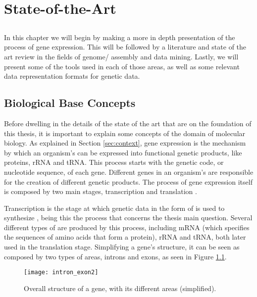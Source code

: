 \chapter{State-of-the-Art} \label{chap:sota}

\section*{}

In this chapter we will begin by making a more in depth presentation of the
process of gene expression. This will be followed by a literature and state of
the art review in the fields of genome/\trans{} assembly and data mining.
Lastly, we will present some of the tools used in each of those areas, as well
as some relevant data representation formats for genetic data.

\section{Biological Base Concepts}

Before dwelling in the details of the state of the art that are on the
foundation of this thesis, it is important to explain some concepts of the
domain of molecular biology. As explained in Section \ref{sec:context}, gene
expression is the mechanism by which an organism's \dna{} can be expressed into
functional genetic products, like proteins, rRNA and tRNA. This process starts
with the genetic code, or nucleotide sequence, of each gene. Different genes in
an organism's \dna{} are responsible for the creation of different genetic
products. The process of gene expression itself is composed by two main stages,
transcription and translation \cite{leic:gene_expr}.

Transcription is the stage at which genetic data in the form of \dna{} is used
to synthesize \rna{}, being this the process that concerns the thesis main
question. Several different types of \rna{} are produced by this process,
including mRNA (which specifies the sequences of amino acids that form a
protein), rRNA and tRNA, both later used in the translation stage. Simplifying a
gene's structure, it can be seen as composed by two types of areas, introns and
exons, as seen in Figure \ref{fig:intron_exon}.

\begin{figure}[!htb]
  \begin{center}
    \leavevmode
    \texttt{[image: intron\_exon2]}
    \caption[Overall structure of a gene]{Overall structure of a gene, with its different areas (simplified).}
    \label{fig:intron_exon}
  \end{center}
\end{figure}

